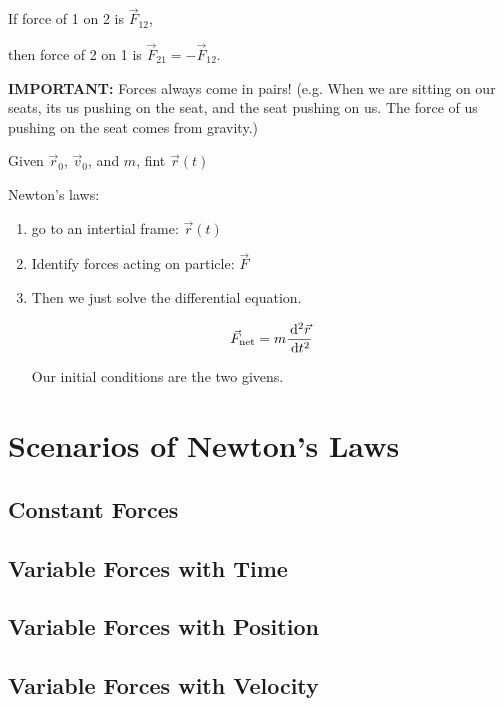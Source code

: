 If force of 1 on 2 is $\vec F_{12}$,

then force of 2 on 1 is $\vec F_{21} = - \vec F_{12}$.

\textbf{IMPORTANT:} Forces always come in pairs! (e.g. When we are sitting on our seats, its us pushing on the seat, and the seat pushing on us. The force of us pushing on the seat comes from gravity.)

\begin{example}
	Given $\vec r_0$, $\vec v_0$, and $m$, fint $\vec r(t)$

	Newton's laws:

	\begin{enumerate}
		\item go to an intertial frame: $\vec r(t)$
		\item Identify forces acting on particle: $\vec F$
		\item Then we just solve the differential equation.
		
		\begin{equation}
			\vec F_\mathrm{net} = m\frac{\D^2 \vec r}{\D t^2}
		\end{equation}

		Our initial conditions are the two givens.
	\end{enumerate}
\end{example}

\section{Scenarios of Newton's Laws}

\subsection{Constant Forces}

\subsection{Variable Forces with Time}

\subsection{Variable Forces with Position}

\subsection{Variable Forces with Velocity}